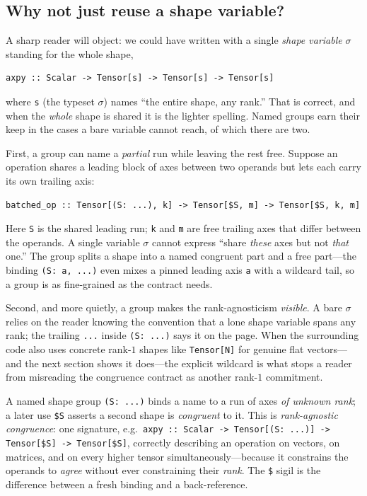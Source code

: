 \subsection{Why not just reuse a shape variable?}
\label{sec:sh-vs-variable}

A sharp reader will object: we could have written  with a single
\emph{shape variable} $\sigma$ standing for the whole shape,
\begin{lstlisting}[style=l4style]
axpy :: Scalar -> Tensor[s] -> Tensor[s] -> Tensor[s]
\end{lstlisting}
where \texttt{s} (the typeset $\sigma$) names ``the entire shape, any rank.''
That is correct, and when the \emph{whole} shape is shared it is the lighter
spelling. Named groups earn their keep in the cases a bare variable cannot
reach, of which there are two.

First, a group can name a \emph{partial} run while leaving the rest free.
Suppose an operation shares a leading block of axes between two operands but
lets each carry its own trailing axis:
\begin{lstlisting}[style=l4style]
batched_op :: Tensor[(S: ...), k] -> Tensor[$S, m] -> Tensor[$S, k, m]
\end{lstlisting}
Here \texttt{S} is the shared leading run; \texttt{k} and \texttt{m} are
free trailing axes that differ between the operands. A single variable
$\sigma$ cannot express ``share \emph{these} axes but not \emph{that} one.''
The group splits a shape into a named congruent part and a free part---the
binding \lstinline[style=l4style]|(S: a, ...)| even mixes a pinned leading
axis \texttt{a} with a wildcard tail, so a group is as fine-grained as the
contract needs.

Second, and more quietly, a group makes the rank-agnosticism
\emph{visible}. A bare $\sigma$ relies on the reader knowing the convention
that a lone shape variable spans any rank; the trailing \texttt{...} inside
\lstinline[style=l4style]|(S: ...)| says it on the page. When the surrounding
code also uses concrete rank-$1$ shapes like
\lstinline[style=l4style]|Tensor[N]| for genuine flat vectors---and the next
section shows it does---the explicit wildcard is what stops a reader from
misreading the congruence contract as another rank-$1$ commitment.

\begin{keyidea}
A named shape group \lstinline[style=l4style]|(S: ...)| binds a name to a run
of axes \emph{of unknown rank}; a later use \lstinline[style=l4style]|$S|
asserts a second shape is \emph{congruent} to it. This is
\emph{rank-agnostic congruence}: one signature, e.g.\
\lstinline[style=l4style]|axpy :: Scalar -> Tensor[(S: ...)] -> Tensor[$S] -> Tensor[$S]|,
correctly describing an operation on vectors, on matrices, and on every
higher tensor simultaneously---because it constrains the operands to
\emph{agree} without ever constraining their \emph{rank}. The
\texttt{\$} sigil is the difference between a fresh binding and a back-reference.
\end{keyidea}

